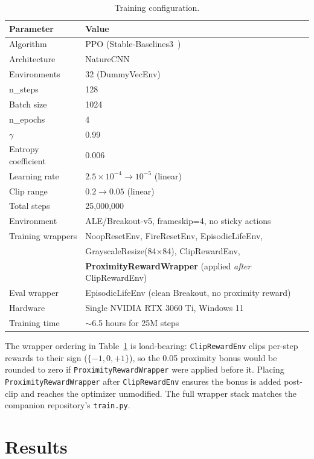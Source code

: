 \documentclass[11pt]{article}
\begin{document}
\begin{table}[h]
\centering
\begin{tabular}{ll}
\toprule
\textbf{Parameter} & \textbf{Value} \\
\midrule
Algorithm & PPO (Stable-Baselines3~\cite{raffin2021sb3}) \\
Architecture & NatureCNN \\
Environments & 32 (DummyVecEnv) \\
n\_steps & 128 \\
Batch size & 1024 \\
n\_epochs & 4 \\
$\gamma$ & 0.99 \\
Entropy coefficient & 0.006 \\
Learning rate & $2.5\times10^{-4} \rightarrow 10^{-5}$ (linear) \\
Clip range & $0.2 \rightarrow 0.05$ (linear) \\
Total steps & 25,000,000 \\
Environment & ALE/Breakout-v5, frameskip=4, no sticky actions \\
Training wrappers & NoopResetEnv, FireResetEnv, EpisodicLifeEnv, \\
& GrayscaleResize(84$\times$84), ClipRewardEnv, \\
& \textbf{ProximityRewardWrapper} (applied \emph{after} ClipRewardEnv) \\
Eval wrapper & EpisodicLifeEnv (clean Breakout, no proximity reward) \\
Hardware & Single NVIDIA RTX 3060 Ti, Windows 11 \\
Training time & $\sim$6.5 hours for 25M steps \\
\bottomrule
\end{tabular}
\caption{Training configuration.}
\label{tab:config}
\end{table}

The wrapper ordering in Table~\ref{tab:config} is load-bearing:
\texttt{ClipRewardEnv} clips per-step rewards to their sign ($\{-1, 0, +1\}$),
so the 0.05 proximity bonus would be rounded to zero if
\texttt{ProximityRewardWrapper} were applied before it. Placing
\texttt{ProximityRewardWrapper} after \texttt{ClipRewardEnv} ensures the bonus
is added post-clip and reaches the optimizer unmodified. The full wrapper stack
matches the companion repository's \texttt{train.py}.

\section{Results}
\end{document}
